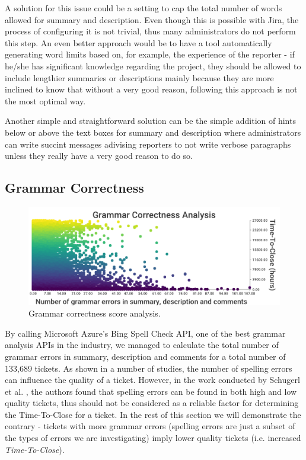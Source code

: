 \documentclass{mpaper}
\begin{document}
A solution for this issue could be a setting to cap the total number of words allowed for summary and 
description. Even though this is possible with Jira, the process of configuring it is not trivial, thus many 
administrators do not perform this step. An even better approach would be to have a tool automatically generating 
word limits based on, for example, the experience of the reporter - if he/she has significant knowledge regarding 
the project, they should be allowed to include lengthier summaries or descriptions mainly because they are more inclined 
to know that without a very good reason, following this approach is not the most optimal way. 

Another simple and straightforward solution can be the simple addition of hints below or above the text boxes for summary 
and description where administrators can write succint messages adivising reporters to not write verbose paragraphs 
unless they really have a very good reason to do so.

\vskip10pt

\subsection{Grammar Correctness}

\begin{figure}[ht]
  \begin{center}
    \includegraphics[scale=0.25]{images/grammar_correctness.png}
  \end{center}
  \caption{\label{grammar}Grammar correctness score analysis.}
\end{figure}

By calling Microsoft Azure's Bing Spell Check API, one of the best grammar analysis APIs in the industry, we 
managed to calculate the total number of grammar errors in summary, description and comments for a total number 
of 133,689 tickets. As shown in a number of studies, the number of spelling errors can influence the quality of a ticket. 
However, in the work conducted by Schugerl et al. \cite{schugerl2008mining}, the authors found that spelling errors 
can be found in both high and low quality tickets, thus should not be considered as a reliable factor for determining
the Time-To-Close for a ticket. In the rest of this section we will demonstrate the contrary - tickets with more 
grammar errors (spelling errors are just a subset of the types of errors we are investigating) imply lower quality
tickets (i.e. increased \emph{Time-To-Close}). 
\end{document}
